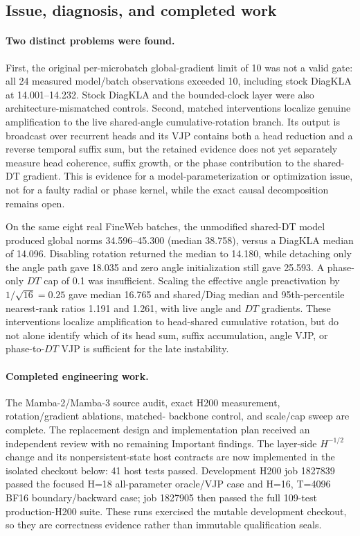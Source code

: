 \documentclass[11pt]{article}
\begin{document}
\subsection{Issue, diagnosis, and completed work}

\paragraph{Two distinct problems were found.}
First, the original per-microbatch global-gradient limit of 10 was not a valid gate: all 24 measured
model/batch observations exceeded 10, including stock DiagKLA at 14.001--14.232.  Stock DiagKLA and
the bounded-clock layer were also architecture-mismatched controls.  Second, matched interventions
localize genuine amplification to the live shared-angle cumulative-rotation branch.  Its output is
broadcast over recurrent heads and its VJP contains both a head reduction and a reverse temporal
suffix sum, but the retained evidence does not yet separately measure head coherence, suffix
growth, or the phase contribution to the shared-DT gradient.  This is evidence for a
model-parameterization or optimization issue, not for a faulty radial or phase kernel, while the
exact causal decomposition remains open.

On the same eight real FineWeb batches, the unmodified shared-DT model produced global norms
34.596--45.300 (median 38.758), versus a DiagKLA median of 14.096.  Disabling rotation returned the
median to 14.180, while detaching only the angle path gave 18.035 and zero angle initialization
still gave 25.593.  A phase-only $DT$ cap of 0.1 was insufficient.  Scaling the effective angle
preactivation by $1/\sqrt{16}=0.25$ gave median 16.765 and shared/Diag median and 95th-percentile
nearest-rank ratios 1.191 and 1.261, with live angle and $DT$ gradients.  These interventions
localize amplification to head-shared cumulative rotation, but do not alone identify which of its
head sum, suffix accumulation, angle VJP, or phase-to-$DT$ VJP is sufficient for the late
instability.

\paragraph{Completed engineering work.}
The Mamba-2/Mamba-3 source audit, exact H200 measurement, rotation/gradient ablations, matched-
backbone control, and scale/cap sweep are complete.  The replacement design and implementation
plan received an independent review with no remaining Important findings.  The layer-side
$H^{-1/2}$ change and its nonpersistent-state host contracts are now implemented in the isolated
checkout below: 41 host tests passed.  Development H200 job 1827839 passed the focused H=18
all-parameter oracle/VJP case and H=16, T=4096 BF16 boundary/backward case; job 1827905 then passed
the full 109-test production-H200 suite.  These runs exercised the mutable development checkout,
so they are correctness evidence rather than immutable qualification seals.
\end{document}
